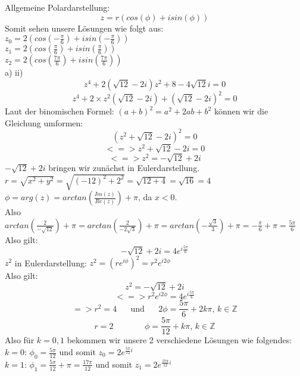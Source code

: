 \documentclass[11pt]{article}
\begin{document}
				Allgemeine Polardarstellung:\\
				$$z=r(cos(\phi)+isin(\phi))$$
\newpage
				\noindent Somit sehen unsere Lösungen wie folgt aus:\\
				\indent $z_0=2(cos\left(-\frac{\pi}{6}\right)+isin\left(-\frac{\pi}{6}\right))$\\
				\indent $z_1=2(cos\left(\frac{\pi}{6}\right)+isin\left(\frac{\pi}{6}\right))$\\
				\indent $z_2=2(cos\left(\frac{7\pi}{6}\right)+isin\left(\frac{7\pi}{6}\right))$\\
			\indent a) \hspace{20pt} ii)\\
				$$z^4+2(\sqrt{12}-2i)z^2+8-4\sqrt{12}i=0$$
				$$z^4+2\times z^2(\sqrt{12}-2i)+(\sqrt{12}-2i)^2=0$$
				Laut der binomischen Formel: $(a+b)^2 = a^2+2ab+b^2$ können wir die Gleichung umformen:\\
				$$(z^2+\sqrt{12}-2i)^2=0$$
				$$<=>z^2+\sqrt{12}-2i=0$$
				$$<=>z^2=-\sqrt{12}+2i$$
				$-\sqrt{12}+2i$ bringen wir zunächst in Eulerdarstellung.\\
				$r=\sqrt{x^2+y^2}=\sqrt{(-12)^2+2^2}=\sqrt{12+4}=\sqrt{16}=4$\\
				$\phi = arg(z) = arctan\left(\frac{Im(z)}{Re(z)}\right) + \pi$, da $x<0$.\\
				\indent Also $arctan \left( \frac{2}{-\sqrt{12}}\right)+\pi = arctan\left(\frac{2}{-2\sqrt{3}}\right)+\pi = arctan \left(-\frac{\sqrt{3}}{3}\right)+\pi = -\frac{\pi}{6}+\pi = \frac{5\pi}{6}$\\
				Also gilt:
				$$-\sqrt{12}+2i=4e^{i\frac{5\pi}{6}}$$
				$z^2$ in Eulerdarstellung: $z^2=(re^{i\phi})^2=r^2e^{i2\phi}$\\
				Also gilt:\\
				$$z^2=-\sqrt{12}+2i$$
				$$<=>r^2e^{i2\phi}=4e^{i\frac{5\pi}{6}}$$
				$$=> r^2 =4 \hspace{20pt} \mbox{und} \hspace{20pt} 2\phi = \frac{5\pi}{6}+2k\pi \mbox{, } k\in\mathbb{Z}$$
				$$r=2 \hspace{45pt} \phi = \frac{5\pi}{12}+k\pi \mbox{, } k\in\mathbb{Z}$$
				Also für $k=0,1$ bekommen wir unsere 2 verschiedene Lösungen wie folgendes:\\
				\indent $k=0$: \hspace{10pt} $\phi _0 = \frac{5\pi}{12}$ und somit $z_0= 2e^{\frac{5\pi}{12}i}$\\
				\indent $k=1$: \hspace{10pt} $\phi _1 = \frac{5\pi}{12} + \pi = \frac{17\pi}{12}$ und somit $z_1=2e^{\frac{17\pi}{12}i}$\\
\end{document}
